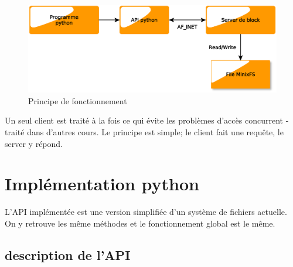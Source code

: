 \documentclass[a4paper,12pt]{article}
\begin{document}
\begin{figure}[H]
\begin{center}
\includegraphics[scale=.6]{imgs/schema_client_server}
\caption{Principe de fonctionnement}
\label{fig:Architecture client server}
\end{center}
\end{figure}


Un seul client est traité à la fois ce qui évite les problèmes d'accès concurrent - traité dans d'autres cours. Le principe est simple; le client fait une requête, le server y répond.\\



\section{Implémentation python}

L'API implémentée est une version simplifiée d'un système de fichiers actuelle. On y retrouve les même méthodes et le fonctionnement global est le même.\\

\subsection{description de l'API}
\end{document}
